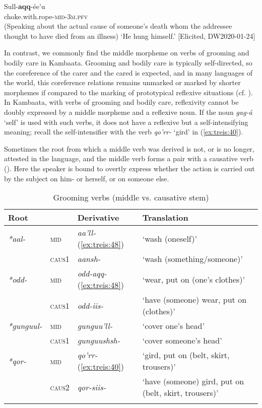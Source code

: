 \documentclass[output=paper]{langscibook}
\begin{document}
\ea \label{ex:treis:47}
\gll Sull-\textbf{aqq}-ée’u\\
     choke.with.rope-\textsc{mid-3m.pfv}\\
\glt (Speaking about the actual cause of someone’s death whom the addressee thought to have died from an illness) ‘He hung himself.’ [Elicited, DW2020-01-24]\z

In contrast, we commonly find the middle morpheme on verbs of grooming and bodily care in Kambaata. Grooming and bodily care is typically self-directed, so the coreference of the carer and the cared is expected, and in many languages of the world, this coreference relations remains unmarked or marked by shorter morphemes if compared to the marking of prototypical reflexive situations (cf. \citealt{Kemmer1994}). In Kambaata, with verbs of grooming and bodily care, reflexivity cannot be doubly expressed by a middle morpheme and a reflexive noun. If the noun \textit{gag-á} ‘self’ is used with such verbs, it does not have a reflexive but a self-intensifying meaning; recall the self-intensifier with the verb \textit{qo’rr-} ‘gird’ in (\ref{ex:treis:40}).

Sometimes the root from which a middle verb was derived is not, or is no longer, attested in the language, and the middle verb forms a pair with a causative verb (). Here the speaker is bound to overtly express whether the action is carried out by the subject on him- or herself, or on someone else. 

\begin{table}
\caption{Grooming verbs (middle vs. causative stem)}
\label{tab:treis:4}
\begin{tabularx}{\textwidth}{lllX}
\lsptoprule
Root &  & Derivative & Translation\\
\hline
\textit{*aal-} & \textsc{mid}  & \textit{aa’ll-} (\ref{ex:treis:48}) & ‘wash (oneself)’\\
& \textsc{caus1} & \textit{aansh-} & \textsc{‘}wash (something/someone)’\\
\textit{*odd-} & \textsc{mid}  & \textit{odd-aqq-} (\ref{ex:treis:48}) & ‘wear, put on (one’s clothes)’\\
& \textsc{caus1} & \textit{odd-iis-} & ‘have (someone) wear, put on (clothes)’\\
\textit{*gunguul-} & \textsc{mid}  & \textit{gunguu’ll-}  & ‘cover one’s head’\\
& \textsc{caus1} & \textit{gunguushsh-} & ‘cover someone’s head’\\
\textit{*qor-} & \textsc{mid}  & \textit{qo’rr-} (\ref{ex:treis:40}) & ‘gird, put on (belt, skirt, trousers)’\\
& \textsc{caus2} & \textit{qor-siis-} & ‘have (someone) gird, put on 
(belt, skirt, trousers)’\\
\lspbottomrule
\end{tabularx}
\end{table}
\end{document}
